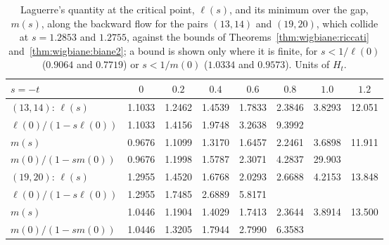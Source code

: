 \begin{table}[htbp]
\centering\footnotesize\setlength{\tabcolsep}{4pt}
\begin{tabular}{lccccccc}
\toprule
$s=-t$ & $0$ & $0.2$ & $0.4$ & $0.6$ & $0.8$ & $1.0$ & $1.2$\\
\midrule
$(13,14)$: $\ell(s)$ & 1.1033 & 1.2462 & 1.4539 & 1.7833 & 2.3846 & 3.8293 & 12.051\\
\quad $\ell(0)/(1-s\ell(0))$ & 1.1033 & 1.4156 & 1.9748 & 3.2638 & 9.3992 & & \\
\quad $m(s)$ & 0.9676 & 1.1099 & 1.3170 & 1.6457 & 2.2461 & 3.6898 & 11.911\\
\quad $m(0)/(1-sm(0))$ & 0.9676 & 1.1998 & 1.5787 & 2.3071 & 4.2837 & 29.903 & \\
\midrule
$(19,20)$: $\ell(s)$ & 1.2955 & 1.4520 & 1.6768 & 2.0293 & 2.6688 & 4.2153 & 13.848\\
\quad $\ell(0)/(1-s\ell(0))$ & 1.2955 & 1.7485 & 2.6889 & 5.8171 & & & \\
\quad $m(s)$ & 1.0446 & 1.1904 & 1.4029 & 1.7413 & 2.3644 & 3.8914 & 13.500\\
\quad $m(0)/(1-sm(0))$ & 1.0446 & 1.3205 & 1.7944 & 2.7990 & 6.3583 & & \\
\bottomrule
\end{tabular}
\caption{Laguerre's quantity at the critical point, $\ell(s)$, and its minimum over the gap, $m(s)$, along the backward flow for the pairs $(13,14)$ and $(19,20)$, which collide at $s=1.2853$ and $1.2755$, against the bounds of Theorems~\ref{thm:wigbiane:riccati} and~\ref{thm:wigbiane:biane2}; a bound is shown only where it is finite, for $s<1/\ell(0)$ ($0.9064$ and $0.7719$) or $s<1/m(0)$ ($1.0334$ and $0.9573$). Units of $H_t$.}
\label{tab:wigbiane:riccati}
\end{table}

